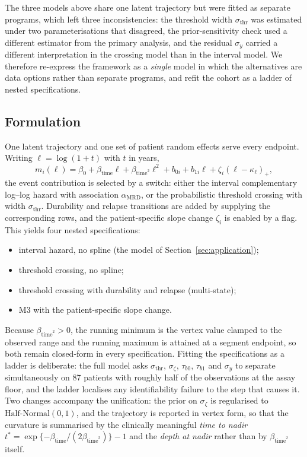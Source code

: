 \documentclass[11pt]{article}
\begin{document}
The three models above share one latent trajectory but were fitted as
separate programs, which left three inconsistencies: the threshold width
$\sigma_{\mathrm{thr}}$ was estimated under two parameterisations that
disagreed, the prior-sensitivity check used a different estimator from the
primary analysis, and the residual $\sigma_y$ carried a different
interpretation in the crossing model than in the interval model. We therefore
re-express the framework as a \emph{single} model in which the alternatives
are data options rather than separate programs, and refit the cohort as a
ladder of nested specifications.

\subsection{Formulation}

One latent trajectory and one set of patient random effects serve every
endpoint. Writing $\ell=\log(1+t)$ with $t$ in years,
\[
m_i(\ell)=\beta_0+\beta_{\mathrm{time}}\ell+\beta_{\mathrm{time}^2}\ell^2
+b_{0i}+b_{1i}\ell+\zeta_i(\ell-\kappa_\ell)_+ ,
\]
the event contribution is selected by a switch: either the interval
complementary log--log hazard with association $\alpha_{\mathrm{MRD}}$, or the
probabilistic threshold crossing with width $\sigma_{\mathrm{thr}}$. Durability
and relapse transitions are added by supplying the corresponding rows, and the
patient-specific slope change $\zeta_i$ is enabled by a flag. This yields four
nested specifications:
\begin{itemize}\itemsep2pt
\item[\textbf{M1}] interval hazard, no spline (the model of Section~\ref{sec:application});
\item[\textbf{M2}] threshold crossing, no spline;
\item[\textbf{M3}] threshold crossing with durability and relapse (multi-state);
\item[\textbf{M3s}] M3 with the patient-specific slope change.
\end{itemize}
Because $\beta_{\mathrm{time}^2}>0$, the running minimum is the vertex value
clamped to the observed range and the running maximum is attained at a segment
endpoint, so both remain closed-form in every specification. Fitting the
specifications as a ladder is deliberate: the full model asks
$\sigma_{\mathrm{thr}}$, $\sigma_\zeta$, $\tau_{b0}$, $\tau_{b1}$ and
$\sigma_y$ to separate simultaneously on 87 patients with roughly half of the
observations at the assay floor, and the ladder localises any identifiability
failure to the step that causes it. Two changes accompany the unification: the
prior on $\sigma_\zeta$ is regularised to $\mathrm{Half\text{-}Normal}(0,1)$,
and the trajectory is reported in vertex form, so that the curvature is
summarised by the clinically meaningful \emph{time to nadir}
$t^\ast=\exp\{-\beta_{\mathrm{time}}/(2\beta_{\mathrm{time}^2})\}-1$ and the
\emph{depth at nadir} rather than by $\beta_{\mathrm{time}^2}$ itself.
\end{document}
